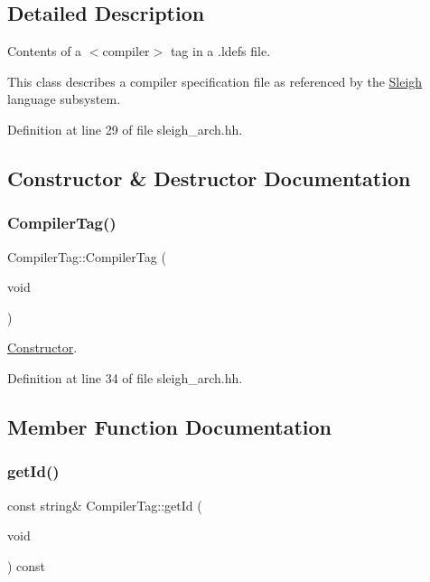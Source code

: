 \subsection{Detailed Description}
Contents of a $<$compiler$>$ tag in a .ldefs file. 

This class describes a compiler specification file as referenced by the \mbox{\hyperlink{class_sleigh}{Sleigh}} language subsystem. 

Definition at line 29 of file sleigh\+\_\+arch.\+hh.



\subsection{Constructor \& Destructor Documentation}
\mbox{\label{class_compiler_tag_a8c2c4eda8d631f5129289b0f90f99c52}} 
\subsubsection{\texorpdfstring{CompilerTag()}{CompilerTag()}}
{\footnotesize\ttfamily Compiler\+Tag\+::\+Compiler\+Tag (\begin{DoxyParamCaption}\item[{void}]{ }\end{DoxyParamCaption})\hspace{0.3cm}{\ttfamily [inline]}}



\mbox{\hyperlink{class_constructor}{Constructor}}. 



Definition at line 34 of file sleigh\+\_\+arch.\+hh.



\subsection{Member Function Documentation}
\mbox{\label{class_compiler_tag_a70b72be387f600dc925eb5afa4f4efd6}} 
\subsubsection{\texorpdfstring{getId()}{getId()}}
{\footnotesize\ttfamily const string\& Compiler\+Tag\+::get\+Id (\begin{DoxyParamCaption}\item[{void}]{ }\end{DoxyParamCaption}) const\hspace{0.3cm}{\ttfamily [inline]}}



